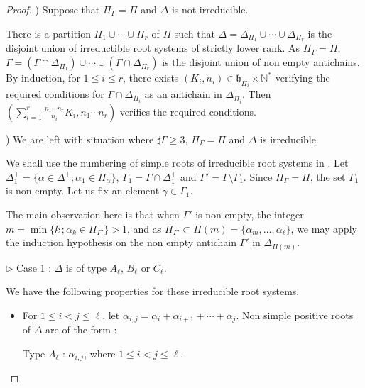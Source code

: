 \documentclass[10pt,a4paper]{amsart}
\numberwithin{equation}{section}
\theoremstyle{plain}
\theoremstyle{definition}
\theoremstyle{remark}
\begin{document}
\begin{proof}
\smallskip
{}) Suppose that $\Pi_{\Gamma} = \Pi$ and $\Delta$ is not irreducible.
\smallskip

There is a partition 
$\Pi_{1} \cup \cdots \cup \Pi_{r}$ of $\Pi$ 
such that $\Delta = \Delta_{\Pi_{1}}\cup \cdots \cup \Delta_{\Pi_{r}}$ is the disjoint union of irreductible 
root systems of strictly lower rank. As $\Pi_{\Gamma} = \Pi$, 
$\Gamma = ( \Gamma\cap \Delta_{\Pi_{1}} ) \cup \cdots \cup
( \Gamma\cap \Delta_{\Pi_{r}})$ is the disjoint union of non empty antichains.
By induction, for $1\leqslant i \leqslant r$, there exists 
$(K_{i} , n_{i}) \in \mathfrak{h}_{\Pi_{i}} \times \mathbb{N}^{*}$ 
verifying the required conditions for $\Gamma\cap \Delta_{\Pi_{i}}$ as an antichain in 
$\Delta_{\Pi_{i}}^{+}$.  Then $( \sum_{i=1}^{r} \frac{n_{1}\cdots n_{r}}{n_{i}} K_{i} , n_{1}\cdots n_{r})$ 
verifies the required conditions.

\smallskip
{}) We are left with situation where $\sharp \Gamma\geqslant 3$, $\Pi_{\Gamma} = \Pi$ and
$\Delta$ is irreducible.
\smallskip

We shall use the numbering of simple roots of irreducible root systems in \cite[Chapter 18]{TY}. 
Let $\Delta_{1}^{+} = \{\alpha \in\Delta^{+} ; \alpha_{1}\in \Pi_{\alpha} \}$,
$\Gamma_{1} = \Gamma \cap \Delta_{1}^{+}$ and $\Gamma' = \Gamma \setminus \Gamma_{1}$.
Since $\Pi_{\Gamma} = \Pi$, the set
$\Gamma_{1}$ is non empty. Let us fix an element $\gamma \in \Gamma_{1}$.

The main observation here is 
that when $\Gamma'$ is non empty, the integer $m = \min \{  k \, ; \alpha_{k} \in \Pi_{\Gamma'} \} >1$, 
and as $\Pi_{\Gamma'} \subset  \Pi (m) = \{ \alpha_{m},\dots ,\alpha_{\ell}\}$, we may apply 
the induction hypothesis on the non empty antichain $\Gamma'$ in $\Delta_{\Pi (m)}$.
\smallskip

\noindent$\triangleright$ Case 1 : $\Delta$ is of type $A_{\ell}$, $B_{\ell}$ or $C_{\ell}$.
\smallskip

We have the following properties for these irreducible root systems.

\begin{itemize}
\item[(P1)] For $1 \leqslant i < j \leqslant \ell$, let 
$\alpha_{i,j} = \alpha_{i} + \alpha_{i+1} + \cdots + \alpha_{j}$. 
Non simple positive roots of $\Delta$ are of the form :

Type $A_{\ell}$ : $\alpha_{i,j}$, where $1 \leqslant i < j \leqslant \ell$.


\end{itemize}
\end{proof}
\end{document}
